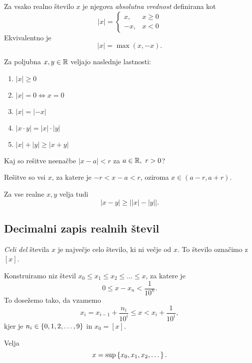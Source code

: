 \documentclass[12pt, a4paper]{article}
\begin{document}
\begin{definicija}
Za vsako realno število $x$ je njegova \emph{absolutna vrednost} definirana kot
\[
|x|=\begin{cases}
x, &x\geq 0\\
-x, &x<0\end{cases}
\]
Ekvivalentno je
\[
|x|=\max(x,-x).
\] 
\end{definicija}

\begin{posledica}
Za poljubna $x,y\in\mathbb{R}$ veljajo naslednje lastnosti:

\begin{enumerate}
\item $|x|\geq 0$
\item $|x|=0\iff x=0$
\item $|x|=|-x|$
\item $|x\cdot y|=|x|\cdot|y|$
\item $|x|+|y|\geq |x+y|$
\end{enumerate}
\end{posledica}

\begin{zgled}
Kaj so rešitve neenačbe $|x-a|<r$ za $a\in\mathbb{R},~r>0$?

Rešitve so vsi $x$, za katere je $-r<x-a<r$, oziroma $x\in(a-r,a+r)$.
\end{zgled}

\begin{opomba}
Za vse realne $x,y$ velja tudi
\[|x-y|\geq\left||x|-|y|\right|.\]
\end{opomba}

\newpage

\subsection{Decimalni zapis realnih števil}

\begin{definicija}
\emph{Celi del} števila $x$ je največje celo število, ki ni večje od $x$. To število označimo z $[x]$.
\end{definicija}

Konstruiramo niz števil $x_0\leq x_1\leq x_2\leq\dots\leq x$, za katere je
\[
0\leq x-x_n<\frac{1}{10^n}.
\]
To dosežemo tako, da vzamemo
\[
x_i=x_{i-1}+\frac{n_i}{10^i}\leq x<x_i+\frac{1}{10^i},
\]
kjer je $n_i\in\left\{0,1,2,\dots,9\right\}$ in $x_0=[x]$.

\begin{trditev}
Velja
\[
x=\sup\left\{x_0,x_1,x_2,\dots\right\}.
\]
\end{trditev}
\end{document}
